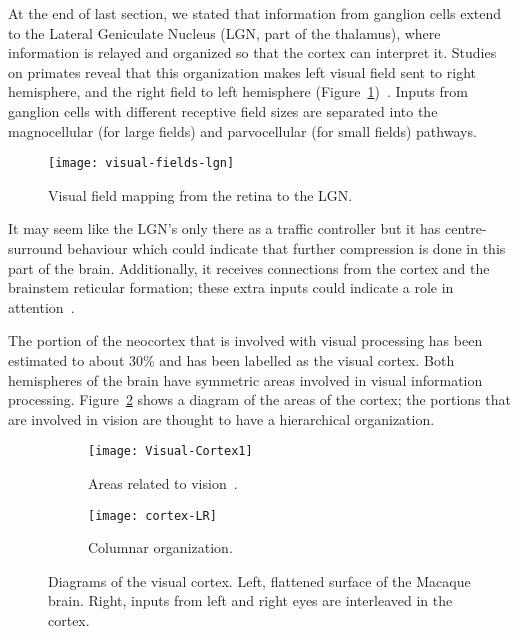 At the end of last section, we stated that information from ganglion cells extend to the Lateral Geniculate Nucleus (LGN, part of the thalamus), where information is relayed and organized so that the cortex can interpret it. Studies on primates reveal that this organization makes left visual field sent to right hemisphere, and the right field to left hemisphere (Figure~\ref{fig:vision:optic-chiasm})~\cite{thompson2000brain}. Inputs from ganglion cells with different receptive field sizes are separated into the magnocellular (for large fields) and parvocellular (for small fields) pathways.

\begin{figure}[h]
  \begin{center}
    \texttt{[image: visual-fields-lgn]}
    \caption{Visual field mapping from the retina to the LGN.}
    \label{fig:vision:optic-chiasm}
  \end{center}
\end{figure}

It may seem like the LGN's only there as a traffic controller but it has centre-surround behaviour which could indicate that further compression is done in this part of the brain. Additionally, it receives connections from the cortex and the brainstem reticular formation; these extra inputs could indicate a role in attention~\cite{eye-brain-vision-hubel1995}.

The portion of the neocortex that is involved with visual processing has been estimated to about 30\% and has been labelled as the visual cortex. Both hemispheres of the brain have symmetric areas involved in visual information processing. Figure~\ref{fig:vision:visual-cortex} shows a diagram of the areas of the cortex; the portions that are involved in vision are thought to have a hierarchical organization.

\begin{figure}[h]
  \begin{center}
    \begin{subfigure}[b]{0.65\textwidth}
      \texttt{[image: Visual-Cortex1]}
      \caption{Areas related to vision~\cite{webvision-images}.}
      \label{fig:vision:visual-cortex}
    \end{subfigure}
    \begin{subfigure}[b]{0.34\textwidth}
      \texttt{[image: cortex-LR]}
      \caption{Columnar organization.}
      \label{fig:vision:visual-cortex-LR}
    \end{subfigure}
    \caption{Diagrams of the visual cortex. Left, flattened surface of the Macaque brain. Right, inputs from left and right eyes are interleaved in the cortex. }
  \end{center}
\end{figure}

